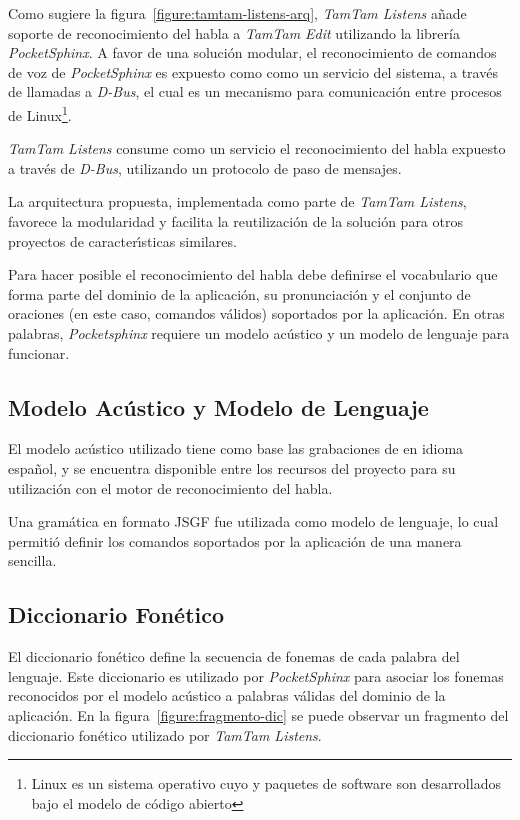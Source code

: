 Como sugiere la figura~\ref{figure:tamtam-listens-arq}, \emph{TamTam Listens} a\~nade soporte 
de reconocimiento del habla a \emph{TamTam Edit} utilizando la librer\'ia \emph{PocketSphinx}.
A favor de una soluci\'on modular, el reconocimiento de comandos de voz de \emph{PocketSphinx} 
es expuesto como como un  servicio del sistema, a trav\'es de llamadas a \emph{D-Bus}\cite{Dbus2013},
el cual es un mecanismo para comunicaci\'on entre procesos de Linux\footnote{Linux es un sistema operativo
cuyo  y paquetes de software son desarrollados bajo el modelo de c\'odigo abierto\cite{LinuxGuideCert}}.

\emph{TamTam Listens} consume como un servicio el reconocimiento del habla expuesto a trav\'es de 
\emph{D-Bus}, utilizando un protocolo de paso de mensajes.

La arquitectura propuesta, implementada como parte de \emph{TamTam Listens}, favorece la modularidad
y facilita la reutilizaci\'on de la soluci\'on para otros proyectos de caracter{\'\i}sticas similares.

Para hacer posible el reconocimiento del habla debe definirse el vocabulario que forma parte del 
dominio de la aplicaci\'on, su pronunciaci\'on y el conjunto de oraciones (en este caso, comandos 
v\'alidos) soportados por la aplicaci\'on.
En otras palabras, \emph{Pocketsphinx} requiere un modelo ac\'ustico y un modelo de lenguaje para funcionar.

\subsection{Modelo Ac\'ustico y Modelo de Lenguaje}

El modelo ac\'ustico utilizado tiene como base las grabaciones de  en idioma espa\~nol,
y se encuentra disponible entre los recursos del proyecto  para su utilizaci\'on
con el motor de reconocimiento del habla.

Una gram\'atica en formato JSGF \cite{JSGF2000} fue utilizada como modelo de lenguaje, lo cual permiti\'o
definir los comandos soportados por la aplicaci\'on de una manera sencilla.

\subsection{Diccionario Fon\'etico}

El diccionario fon\'etico define la secuencia de fonemas de cada palabra del lenguaje.
Este diccionario es utilizado por \emph{PocketSphinx} para asociar los fonemas reconocidos por
el modelo ac\'ustico a palabras v\'alidas del dominio de la aplicaci\'on.
En la figura~\ref{figure:fragmento-dic} se puede observar un fragmento del diccionario fon\'etico
utilizado por \emph{TamTam Listens}.


